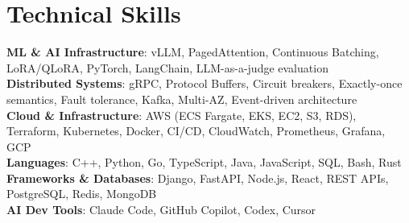 \documentclass[letterpaper,11pt]{article}
\begin{document}
\section{Technical Skills}
\vspace{-7pt}
\begin{itemize}
[leftmargin=0.15in, label={}]\small{\item{
        \textbf{ML \& AI Infrastructure}{: vLLM, PagedAttention, Continuous Batching, LoRA/QLoRA, PyTorch, LangChain, LLM-as-a-judge evaluation} \\
        \textbf{Distributed Systems}{: gRPC, Protocol Buffers, Circuit breakers, Exactly-once semantics, Fault tolerance, Kafka, Multi-AZ, Event-driven architecture} \\
        \textbf{Cloud \& Infrastructure}{: AWS (ECS Fargate, EKS, EC2, S3, RDS), Terraform, Kubernetes, Docker, CI/CD, CloudWatch, Prometheus, Grafana, GCP} \\
        \textbf{Languages}{: C++, Python, Go, TypeScript, Java, JavaScript, SQL, Bash, Rust} \\
        \textbf{Frameworks \& Databases}{: Django, FastAPI, Node.js, React, REST APIs, PostgreSQL, Redis, MongoDB} \\
        \textbf{AI Dev Tools}{: Claude Code, GitHub Copilot, Codex, Cursor} \\
}}
\end{itemize}
\end{document}
